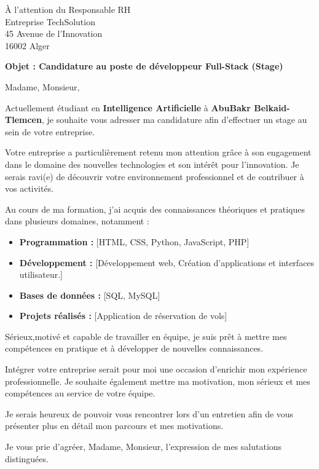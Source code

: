 \documentclass[11pt,a4paper]{letter}
\newcommand{\conc}[1]{
    \noindent\textbf{#1}\par
}
\begin{document}
\begin{letter}{
    À l'attention du Responsable RH\\{}
    Entreprise TechSolution\\{}
    45 Avenue de l'Innovation\\{}
    16002 Alger
}

\date{\today}

\conc{Objet : Candidature au poste de développeur Full-Stack (Stage)}

\opening{Madame, Monsieur,}

Actuellement étudiant en \textbf{Intelligence Artificielle}
à \textbf{AbuBakr Belkaid-Tlemcen}, je souhaite vous
adresser ma candidature afin d'effectuer un stage
au sein de votre entreprise.

Votre entreprise a particulièrement retenu mon
attention grâce à son engagement dans le domaine des nouvelles
technologies et son intérêt pour l'innovation. Je serais ravi(e) de découvrir
votre environnement professionnel et de contribuer
à vos activités.

Au cours de ma formation, j'ai acquis des
connaissances théoriques et pratiques dans
plusieurs domaines, notamment :

\begin{itemize}
    \item \textbf{Programmation :}
    [HTML, CSS, Python, JavaScript, PHP]

    \item \textbf{Développement :}
    [Développement web,
    Création d'applications et interfaces utilisateur.]

    \item \textbf{Bases de données :}
    [SQL, MySQL]

    \item \textbf{Projets réalisés :}
    [Application de réservation de vols]
\end{itemize}

Sérieux,motivé et capable de travailler
en équipe, je suis prêt à mettre mes compétences
en pratique et à développer de nouvelles connaissances.

Intégrer votre entreprise serait pour moi une
occasion d'enrichir mon expérience professionnelle.
Je souhaite également mettre ma motivation,
mon sérieux et mes compétences au service de
votre équipe.

Je serais heureux de pouvoir vous rencontrer
lors d'un entretien afin de vous présenter plus
en détail mon parcours et mes motivations.

\closing{
Je vous prie d'agréer, Madame, Monsieur,
l'expression de mes salutations distinguées.
}

\end{letter}
\end{document}
